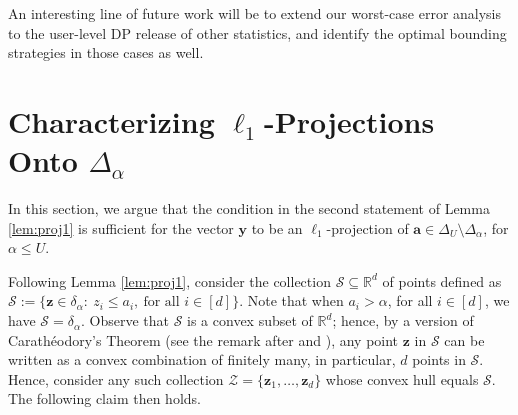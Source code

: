 \documentclass[conference,letterpaper]{IEEEtran}
\theoremstyle{remark}
\theoremstyle{definition}
\begin{document}
An interesting line of future work will be to extend our worst-case error analysis to the user-level DP release of other statistics, and identify the optimal bounding strategies in those cases as well.


{\footnotesize
	}
\appendix
\section{Characterizing $\ell_1$-Projections Onto $\Delta_\alpha$}
\label{app:projection}
In this section, we argue that the condition in the second statement of Lemma \ref{lem:proj1} is sufficient for the vector $\mathbf{y}$ to be an $\ell_1$-projection of $\mathbf{a}\in \Delta_U\setminus \Delta_\alpha$, for $\alpha\leq U$.

Following Lemma \ref{lem:proj1}, consider the collection $\mathcal{S}\subseteq \mathbb{R}^d$ of points defined as $\mathcal{S}:= \{\mathbf{z}\in \delta_\alpha:\ z_i\leq a_i,\ \text{for all $i\in [d]$}\}$. Note that  when $a_i>\alpha$, for all $i\in [d]$, we have $\mathcal{S} = \delta_\alpha$. Observe that $\mathcal{S}$ is a convex subset of $\mathbb{R}^d$; hence, by a version of Carath\'eodory's Theorem (see the remark after \cite[Thm. 15.3.5]{cover_thomas} and \cite{carath}), any point $\mathbf{z}$ in $\mathcal{S}$ can be written as a convex combination of finitely many, in particular, $d$ points in $\mathcal{S}$. Hence, consider any such collection $\mathcal{Z} = \{\mathbf{z}_1,\ldots,\mathbf{z}_d\}$ whose convex hull equals $\mathcal{S}$. The following claim then holds.

\end{document}
